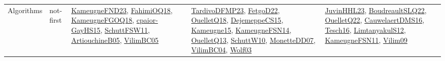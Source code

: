 {\begin{longtable}{lp{3cm}>{\raggedright}p{6cm}>{\raggedright}p{6cm}p{8cm}}
Algorithms & not-first & \href{papers/KameugneFND23.pdf}{KameugneFND23}\cite{KameugneFND23}, \href{articles/FahimiOQ18.pdf}{FahimiOQ18}\cite{FahimiOQ18}, \href{papers/KameugneFGOQ18.pdf}{KameugneFGOQ18}\cite{KameugneFGOQ18}, \href{papers/cpaior-GayHS15.pdf}{cpaior-GayHS15}\cite{cpaior-GayHS15}, \href{articles/SchuttFSW11.pdf}{SchuttFSW11}\cite{SchuttFSW11}, \href{papers/ArtiouchineB05.pdf}{ArtiouchineB05}\cite{ArtiouchineB05}, \href{articles/VilimBC05.pdf}{VilimBC05}\cite{VilimBC05} & \href{papers/TardivoDFMP23.pdf}{TardivoDFMP23}\cite{TardivoDFMP23}, \href{articles/FetgoD22.pdf}{FetgoD22}\cite{FetgoD22}, \href{papers/OuelletQ18.pdf}{OuelletQ18}\cite{OuelletQ18}, \href{papers/DejemeppeCS15.pdf}{DejemeppeCS15}\cite{DejemeppeCS15}, \href{articles/Kameugne15.pdf}{Kameugne15}\cite{Kameugne15}, \href{articles/KameugneFSN14.pdf}{KameugneFSN14}\cite{KameugneFSN14}, \href{papers/OuelletQ13.pdf}{OuelletQ13}\cite{OuelletQ13}, \href{papers/SchuttW10.pdf}{SchuttW10}\cite{SchuttW10}, \href{papers/MonetteDD07.pdf}{MonetteDD07}\cite{MonetteDD07}, \href{papers/VilimBC04.pdf}{VilimBC04}\cite{VilimBC04}, \href{papers/Wolf03.pdf}{Wolf03}\cite{Wolf03} & \href{papers/JuvinHHL23.pdf}{JuvinHHL23}\cite{JuvinHHL23}, \href{papers/BoudreaultSLQ22.pdf}{BoudreaultSLQ22}\cite{BoudreaultSLQ22}, \href{papers/OuelletQ22.pdf}{OuelletQ22}\cite{OuelletQ22}, \href{papers/CauwelaertDMS16.pdf}{CauwelaertDMS16}\cite{CauwelaertDMS16}, \href{papers/Tesch16.pdf}{Tesch16}\cite{Tesch16}, \href{articles/LimtanyakulS12.pdf}{LimtanyakulS12}\cite{LimtanyakulS12}, \href{papers/KameugneFSN11.pdf}{KameugneFSN11}\cite{KameugneFSN11}, \href{papers/Vilim09.pdf}{Vilim09}\cite{Vilim09}\\

\end{longtable}}
